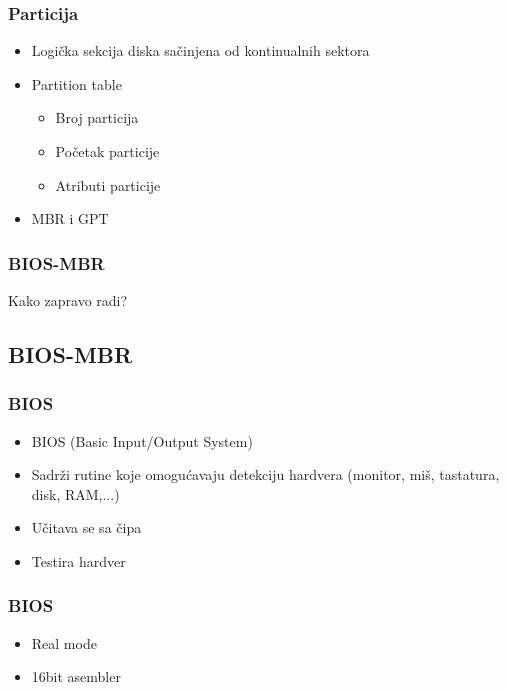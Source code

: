 \documentclass{beamer}
\begin{document}
\begin{frame}
    \frametitle{Particija}
    \begin{itemize}
        \item Logička sekcija diska sačinjena od kontinualnih sektora \newline
        \item Partition table \begin{itemize}
            \item Broj particija \newline
            \item Početak particije \newline
            \item Atributi particije \newline
        \end{itemize}
        \item MBR i GPT
    \end{itemize}
\end{frame}

\begin{frame}
    \frametitle{BIOS-MBR}
    \begin{center}
        \large{Kako zapravo radi?}
    \end{center}
\end{frame}

\subsection*{BIOS-MBR}
\begin{frame}
    \frametitle{BIOS}
    \begin{itemize}
        \item BIOS (Basic Input/Output System) \newline
        \item Sadrži rutine koje omogućavaju detekciju hardvera (monitor, miš, tastatura, disk, RAM,...) \newline
        \item Učitava se sa čipa \newline
        \item Testira hardver
    \end{itemize}
\end{frame}

\begin{frame}
    \frametitle{BIOS}
    \begin{itemize}
        \item Real mode \newline
        \item 16bit asembler
    \end{itemize}
\end{frame}
\end{document}
